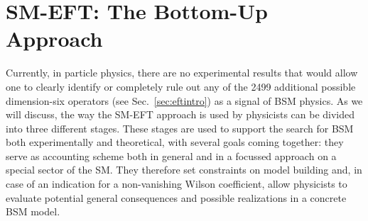 
\section{SM-EFT: The Bottom-Up Approach}
\label{sec:classification}

Currently, in particle physics, there are no experimental
results that would allow one to clearly identify or completely rule out any of the 2499 additional possible
dimension-six operators
(see Sec.~\ref{sec:eftintro}) as a signal of BSM physics. 
As we will discuss, the way the SM-EFT approach is used by physicists can be divided into three different stages.
These stages are used to support the search for BSM both experimentally and theoretical,
with several goals coming together: they serve as accounting scheme both in general and in a
focussed approach on a special sector of the SM. 
They therefore set constraints on model building and, in case of an indication for a non-vanishing
Wilson coefficient, allow physicists to evaluate potential general consequences and possible 
realizations in a concrete BSM model.

